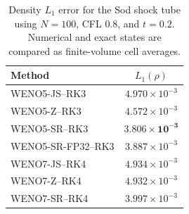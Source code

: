 \begin{table}[H]
\centering
\caption{Density $L_1$ error for the Sod shock tube using $N=100$, CFL
$0.8$, and $t=0.2$.  Numerical and exact states are compared as finite-volume
cell averages.}
\label{tab:sod_n100_l1_weno_z}
\small
\begin{tabular}{lc}
\toprule
Method & $L_1(\rho)$ \\
\midrule
WENO5-JS--RK3      & $4.970\times10^{-3}$ \\
WENO5-Z--RK3       & $4.572\times10^{-3}$ \\
WENO5-SR--RK3      & $\mathbf{3.806\times10^{-3}}$ \\
WENO5-SR-FP32--RK3 & $3.887\times10^{-3}$ \\
WENO7-JS--RK4      & $4.934\times10^{-3}$ \\
WENO7-Z--RK4       & $4.932\times10^{-3}$ \\
WENO7-SR--RK4      & $3.997\times10^{-3}$ \\
\bottomrule
\end{tabular}
\end{table}
